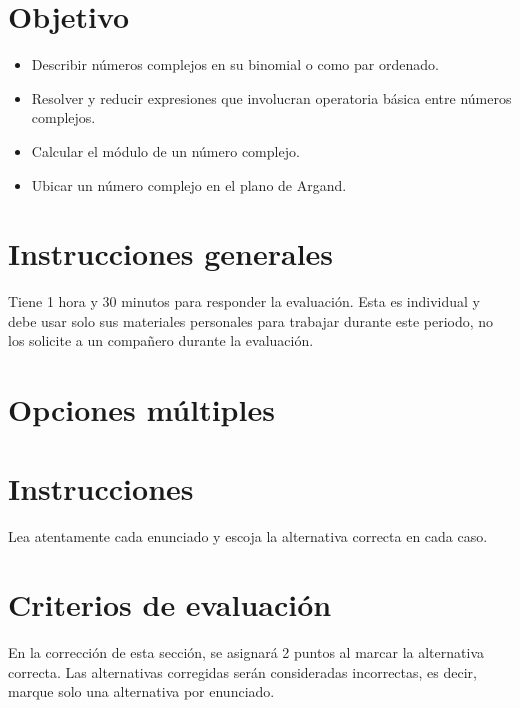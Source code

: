 \documentclass[]{srs}
\begin{document}
\section*{Objetivo}

\begin{itemize}[nosep]
  \item Describir números complejos en su binomial o como par ordenado.
  \item Resolver y reducir expresiones que involucran operatoria básica entre números complejos.
  \item Calcular el módulo de un número complejo.
  \item Ubicar un número complejo en el plano de Argand.
\end{itemize}

\section*{Instrucciones generales}
  Tiene 1 hora y 30 minutos para responder la evaluación. Esta es individual y debe
  usar solo sus materiales personales para trabajar durante este periodo, no los solicite
  a un compañero durante la evaluación.

\section{Opciones múltiples}

\section*{Instrucciones}
Lea atentamente cada enunciado y escoja la alternativa correcta en cada caso.

\section*{Criterios de evaluación}
En la corrección de esta sección, se asignará 2 puntos al marcar la alternativa correcta.
Las alternativas corregidas serán consideradas incorrectas, es decir, marque solo una
alternativa por enunciado.

\separador[2mm]
\end{document}
